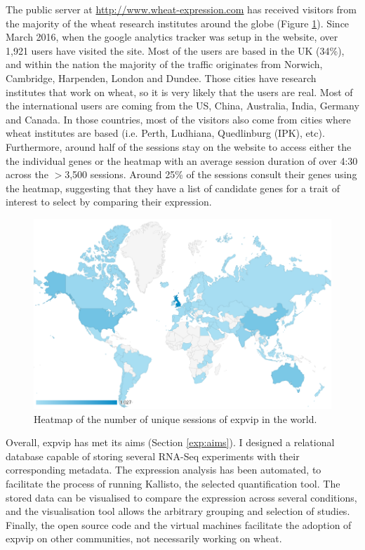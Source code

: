 The public server at \url{http://www.wheat-expression.com} has received visitors from the majority of the wheat research institutes around the globe (Figure \ref{fig:exp:users}). 
Since March 2016, when the google analytics tracker was setup in the website, over 1,921 users have visited the site. 
Most of the users are based in the UK (34\%), and within the nation the majority of the traffic originates from Norwich, Cambridge, Harpenden, London and Dundee. 
Those cities have research institutes that work on wheat, so it is very likely that the users are real. 
Most of the international users are coming from the US, China, Australia, India, Germany and Canada. 
In those countries, most of the visitors also come from cities where wheat institutes are based (i.e. Perth, Ludhiana, Quedlinburg (IPK), etc). 
Furthermore, around half of the sessions stay on the website to access either the the individual genes or the heatmap  with an average session duration of over 4:30 across the $>$3,500 sessions. 
Around 25\% of the sessions consult their genes using the heatmap, suggesting that they have a list of candidate genes for a trait of interest to select by comparing their expression.

\begin{figure}
\includegraphics[width=1\textwidth]{expVIP/Figures/WorldSessions.png}
\caption{Heatmap of the number of unique sessions of \gls{expvip} in the world.}
\label{fig:exp:users}
\end{figure}

Overall, \gls{expvip} has met its aims (Section \ref{exp:aims}). 
I designed a relational database capable of storing several RNA-Seq experiments with their corresponding metadata. 
The expression analysis has been automated, to facilitate the process of running Kallisto, the selected quantification tool. 
The stored data can be visualised to compare the expression across several conditions, and the visualisation tool allows the arbitrary grouping and selection of studies. 
Finally, the open source code and the virtual machines facilitate the adoption of \gls{expvip} on other communities, not necessarily working on wheat. 
